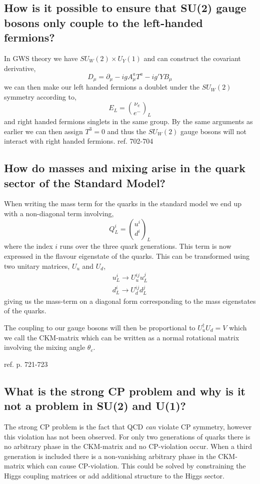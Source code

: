 \documentclass[paper=a4, fontsize=11pt]{scrartcl} %
\numberwithin{equation}{section} %
\numberwithin{figure}{section} %
\numberwithin{table}{section} %
\begin{document}
\subsection*{How is it possible to ensure that SU(2) gauge bosons only couple to the left-handed fermions?}
In GWS theory we have $SU_W(2) \times U_Y(1)$ and can construct the covariant derivative, 
\begin{equation}
D_{\mu} = \partial_{\mu} - igA_{\mu}^aT^a-ig'YB_{\mu}
\end{equation}
we can then make our left handed fermions a doublet under the $SU_W(2)$ symmetry according to,
\begin{equation}
E_L = {\nu_e \choose e^-}_L
\end{equation}
and right handed fermions singlets in the same group. By the same arguments as earlier we can then assign $T^3 = 0$ and thus the $SU_W(2)$ gauge bosons will not interact with right handed fermions.
ref. 702-704




\subsection*{How do masses and mixing arise in the quark sector of the Standard Model?}
When writing the mass term for the quarks in the standard model we end up with a non-diagonal term involving,
\begin{equation}
Q^i_L = {u^i \choose d^i}_L
\end{equation}
where the index $i$ runs over the three quark generations. This term is now expressed in the flavour eigenstate of the quarks. This can be transformed using two unitary matrices, $U_u$ and $U_d$,
\begin{equation}
\begin{split}
u^i_L \rightarrow U^{ij}_u u^j_L \\
d^i_L \rightarrow U^{ij}_d d^j_L
\end{split}
\end{equation}
giving us the mass-term on a diagonal form corresponding to the mass eigenstates of the quarks. 

The coupling to our gauge bosons will then be proportional to $U_u^{\dagger}U_d = V$ which we call the CKM-matrix which can be written as a normal rotational matrix involving the mixing angle $\theta_c$.

ref. p. 721-723

\subsection*{What is the strong CP problem and why is it not a problem in SU(2) and U(1)?}
The strong CP problem is the fact that QCD \textit{can} violate CP symmetry, however this violation has not been observed. For only two generations of quarks there is no arbitrary phase in the CKM-matrix and no CP-violation occur. When a third generation is included there is a non-vanishing arbitrary phase in the CKM-matrix which can cause CP-violation. This could be solved by constraining the Higgs coupling matrices or add additional structure to the Higgs sector. 
\end{document}
